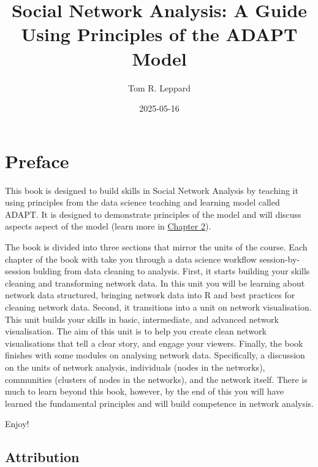 \documentclass[
  letterpaper,
  DIV=11,
  numbers=noendperiod]{scrreprt}
\title{Social Network Analysis: A Guide Using Principles of the ADAPT
Model}
\author{Tom R. Leppard}
\date{2025-05-16}
\renewcommand*\contentsname{Table of contents}
\newcommand\contentsname{Table of contents}
\begin{document}
\maketitle

\renewcommand*\contentsname{Table of contents}
{
\hypersetup{linkcolor=}
\setcounter{tocdepth}{2}
\tableofcontents
}


\chapter*{Preface}\label{preface}


This book is designed to build skills in Social Network Analysis by
teaching it using principles from the data science teaching and learning
model called ADAPT. It is designed to demonstrate principles of the
model and will discuss aspects aspect of the model (learn more in
\href{intro.qmd}{Chapter 2}).

The book is divided into three sections that mirror the units of the
course. Each chapter of the book with take you through a data science
workflow session-by-session bulding from data cleaning to analysis.
First, it starts building your skills cleaning and transforming network
data. In this unit you will be learning about network data structured,
bringing network data into R and best practices for cleaning network
data. Second, it transitions into a unit on network visualisation. This
unit builds your skills in basic, intermediate, and advanced network
visualisation. The aim of this unit is to help you create clean network
visualisations that tell a clear story, and engage your viewers.
Finally, the book finishes with some modules on analysing network data.
Specifically, a discussion on the units of network analysis, individuals
(nodes in the networks), communities (clusters of nodes in the
networks), and the network itself. There is much to learn beyond this
book, however, by the end of this you will have learned the fundamental
principles and will build competence in network analysis.

Enjoy!

\section*{Attribution}\label{attribution}
\end{document}
